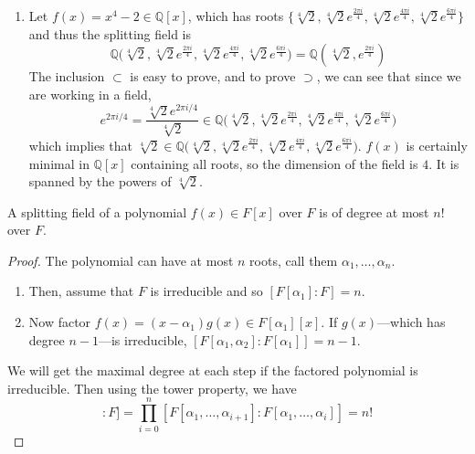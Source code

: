 \begin{example}
\begin{enumerate}
      \item Let $f(x) = x^4 - 2 \in \mathbb{Q}[x]$, which has roots $\{ \sqrt[4]{2}, \sqrt[4]{2} e^{\frac{2\pi i}{4}}, \sqrt[4]{2} e^{\frac{4\pi i}{4}}, \sqrt[4]{2} e^{\frac{6\pi i}{4}} \}$ and thus the splitting field is 
      \begin{equation}
        \mathbb{Q} \big( \sqrt[4]{2}, \sqrt[4]{2} e^{\frac{2\pi i}{4}}, \sqrt[4]{2} e^{\frac{4\pi i}{4}}, \sqrt[4]{2} e^{\frac{6\pi i}{4}} \big) = \mathbb{Q}(\sqrt[4]{2}, e^{\frac{2\pi i}{4}})
      \end{equation}
      The inclusion $\subset$ is easy to prove, and to prove $\supset$, we can see that since we are working in a field, 
      \begin{equation}
        e^{2 \pi i / 4} = \frac{\sqrt[4]{2} e^{2\pi i/4}}{\sqrt[4]{2}} \in \mathbb{Q} \big( \sqrt[4]{2}, \sqrt[4]{2} e^{\frac{2\pi i}{4}}, \sqrt[4]{2} e^{\frac{4\pi i}{4}}, \sqrt[4]{2} e^{\frac{6\pi i}{4}} \big) 
      \end{equation}
      which implies that $\sqrt[4]{2} \in \mathbb{Q} \big( \sqrt[4]{2}, \sqrt[4]{2} e^{\frac{2\pi i}{4}}, \sqrt[4]{2} e^{\frac{4\pi i}{4}}, \sqrt[4]{2} e^{\frac{6\pi i}{4}} \big)$. $f(x)$ is certainly minimal in $\mathbb{Q}[x]$ containing all roots, so the dimension of the field is $4$. It is spanned by the powers of $\sqrt[4]{2}$. 
    \end{enumerate}
  \end{example}

  \begin{theorem}
    A splitting field of a polynomial $f(x) \in F[x]$ over $F$ is of degree at most $n!$ over $F$. 
  \end{theorem}
  \begin{proof}
    The polynomial can have at most $n$ roots, call them $\alpha_1, \ldots, \alpha_n$. 
    \begin{enumerate}
      \item Then, assume that $F$ is irreducible and so $[F[\alpha_1]: F] = n$. 
      \item Now factor $f(x) = (x - \alpha_1) g(x) \in F[\alpha_1][x]$. If $g(x)$---which has degree $n-1$---is irreducible, $[F[\alpha_1, \alpha_2]:F[\alpha_1]] = n-1$. 
    \end{enumerate}
    We will get the maximal degree at each step if the factored polynomial is irreducible. Then using the tower property, we have 
    \begin{equation}
      [F[\alpha_1, \ldots, \alpha_n]:F] = \prod_{i=0}^n [F[\alpha_1, \ldots, \alpha_{i+1}]: F[\alpha_1, \ldots, \alpha_i]] = n!
    \end{equation}
  \end{proof}

